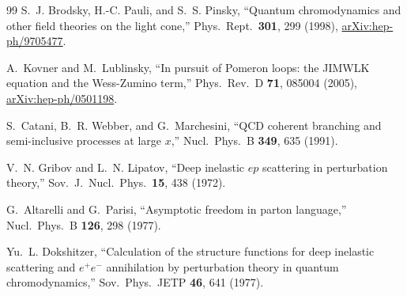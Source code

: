 \begin{thebibliography}{99}
S.~J. Brodsky, H.-C. Pauli, and S.~S. Pinsky, ``Quantum chromodynamics and other field theories on the light cone,'' Phys.\ Rept.\ \textbf{301}, 299 (1998), \href{https://arxiv.org/abs/hep-ph/9705477}{arXiv:hep-ph/9705477}.

A.~Kovner and M.~Lublinsky, ``In pursuit of Pomeron loops: the JIMWLK equation and the Wess-Zumino term,'' Phys.\ Rev.\ D \textbf{71}, 085004 (2005), \href{https://arxiv.org/abs/hep-ph/0501198}{arXiv:hep-ph/0501198}.

S.~Catani, B.~R. Webber, and G.~Marchesini, ``QCD coherent branching and semi-inclusive processes at large $x$,'' Nucl.\ Phys.\ B \textbf{349}, 635 (1991).

V.~N. Gribov and L.~N. Lipatov, ``Deep inelastic $e p$ scattering in perturbation theory,'' Sov.\ J.\ Nucl.\ Phys.\ \textbf{15}, 438 (1972).

G.~Altarelli and G.~Parisi, ``Asymptotic freedom in parton language,'' Nucl.\ Phys.\ B \textbf{126}, 298 (1977).

Yu.~L. Dokshitzer, ``Calculation of the structure functions for deep inelastic scattering and $e^+e^-$ annihilation by perturbation theory in quantum chromodynamics,'' Sov.\ Phys.\ JETP \textbf{46}, 641 (1977).

\end{thebibliography}
